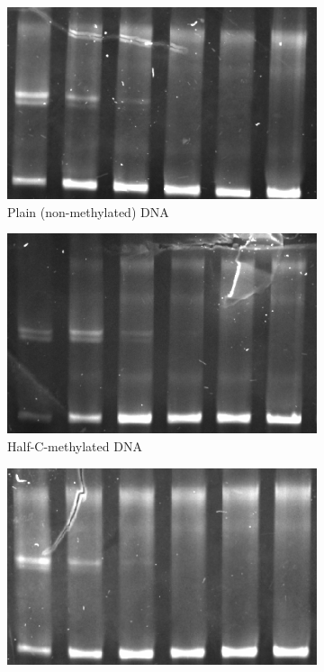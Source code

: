 \documentclass[parskip=full, numbers=noenddot]{scrreprt}
\begin{document}
\begin{figure}[htpb]
  \centering
  \begin{subfigure}[htpb]{0.4\textwidth}
    \centering
    \includegraphics[width=\textwidth]{reconstnuc_a}
    \caption{Plain (non-methylated) DNA}
    \label{fig:reconstnuc_a}
  \end{subfigure}
  \begin{subfigure}[htpb]{0.4\textwidth}
    \centering
    \includegraphics[width=\textwidth]{reconstnuc_b}
    \caption{Half-C-methylated DNA}
    \label{fig:reconstnuc_b}
  \end{subfigure}
  \begin{subfigure}[htpb]{0.4\textwidth}
    \centering
    \includegraphics[width=\textwidth]{reconstnuc_c}

\end{subfigure}
\end{figure}
\end{document}
